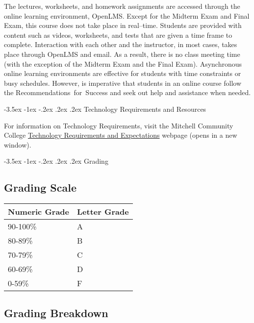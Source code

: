 \documentclass{article}
\makeatletter
\renewcommand\section{\@startsection{section}{1}{0pt}%
  {-3.5ex \@plus -1ex \@minus -.2ex}%
  {.2ex \@plus.2ex}%
  {\normalfont\Large\bfseries}} %
\makeatother
\begin{document}
The lectures, worksheets, and homework assignments are accessed through the online learning environment, OpenLMS. Except for the Midterm Exam and Final Exam, this course does not take place in real--time. Students are provided with content such as videos, worksheets, and tests that are given a time frame to complete. Interaction with each other and the instructor, in most cases, takes place through OpenLMS and email. As a result, there is no class meeting time (with the exception of the Midterm Exam and the Final Exam). Asynchronous online learning environments are effective for students with time constraints or busy schedules. However, is imperative that students in an online course follow the Recommendations~for~Success and seek out help and assistance when needed.

\section{Technology Requirements and Resources}

For information on Technology Requirements, visit the Mitchell Community College \href{https://www.mitchellcc.edu/college-credit-online-classes/\#online-learning}{Technology Requirements and Expectations} webpage (opens in a new window).

\section{Grading}

\subsection{Grading Scale}

\bigskip\noindent
\begin{tabular}{p{}p{}}
\toprule
Numeric Grade & Letter Grade \\
\hline
90-100\% & A \\
80-89\% & B \\
70-79\% & C \\
60-69\% & D \\
0-59\% & F \\
\bottomrule
\end{tabular}

\bigskip\subsection{Grading Breakdown}
\end{document}
